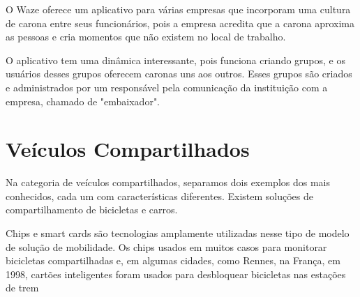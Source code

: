 O Waze oferece um aplicativo para várias empresas que incorporam uma cultura de carona entre seus funcionários, pois a empresa acredita que a carona aproxima as pessoas e cria momentos que não existem no local de trabalho.

O aplicativo tem uma dinâmica interessante, pois funciona criando grupos, e os usuários desses grupos oferecem caronas uns aos outros. %
Esses grupos são criados e administrados por um responsável pela comunicação da instituição com a empresa, chamado de "embaixador".




\section{Veículos Compartilhados}
Na categoria de veículos compartilhados, separamos dois exemplos dos mais conhecidos, cada um com características diferentes. Existem soluções de compartilhamento de bicicletas e carros.

Chips e smart cards são tecnologias amplamente utilizadas nesse tipo de modelo de solução de mobilidade. Os chips usados em muitos casos para monitorar bicicletas compartilhadas e, em algumas cidades, como Rennes, na França, em 1998, cartões inteligentes foram usados para desbloquear bicicletas nas estações de trem \cite{caronae}

